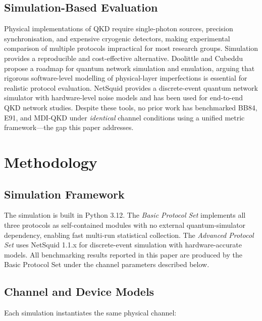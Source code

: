 \documentclass[conference]{IEEEtran}
\begin{document}
\subsection{Simulation-Based Evaluation}

Physical implementations of QKD require single-photon sources, precision
synchronisation, and expensive cryogenic detectors, making experimental
comparison of multiple protocols impractical for most research groups.
Simulation provides a reproducible and cost-effective alternative. Doolittle
and Cubeddu \cite{doolittle2026} propose a roadmap for quantum network
simulation and emulation, arguing that rigorous software-level modelling of
physical-layer imperfections is essential for realistic protocol evaluation.
NetSquid \cite{coopmans2021} provides a discrete-event quantum network
simulator with hardware-level noise models and has been used for end-to-end
QKD network studies. Despite these tools, no prior work has benchmarked
BB84, E91, and MDI-QKD under \emph{identical} channel conditions using a
unified metric framework---the gap this paper addresses.

\section{Methodology}

\subsection{Simulation Framework}

The simulation is built in Python 3.12. The \emph{Basic Protocol Set}
implements all three protocols as self-contained modules with no external
quantum-simulator dependency, enabling fast multi-run statistical collection.
The \emph{Advanced Protocol Set} uses NetSquid 1.1.x for discrete-event
simulation with hardware-accurate models. All benchmarking results reported
in this paper are produced by the Basic Protocol Set under the channel
parameters described below.

\subsection{Channel and Device Models}

Each simulation instantiates the same physical channel:
\end{document}
